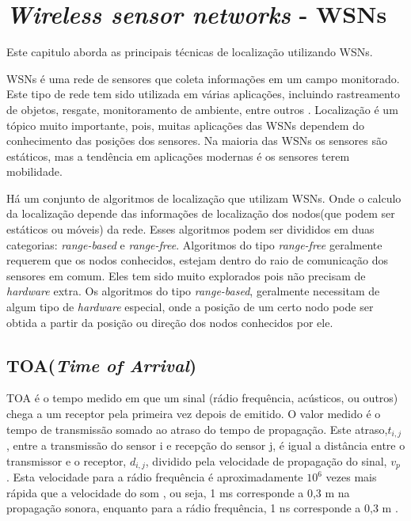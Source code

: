 \chapter{\textit{Wireless sensor networks} - WSNs}

Este capitulo aborda as principais técnicas de localização utilizando WSNs.

\label{wsn}
	WSNs é uma rede de sensores que coleta informações em um campo monitorado. Este tipo de rede tem sido utilizada em 
	várias aplicações, incluindo rastreamento de objetos, resgate, monitoramento de ambiente, entre outros \cite{omc}. Localização é um 
	tópico muito importante, pois, muitas aplicações das WSNs dependem do conhecimento das posições dos sensores. Na maioria das WSNs 
	os sensores são estáticos, mas a tendência em aplicações modernas é os sensores terem mobilidade.
	
	Há um conjunto de algoritmos de localização que utilizam WSNs. Onde o calculo da localização depende das informações 
	de localização dos nodos(que podem ser estáticos ou móveis) da rede. Esses algoritmos podem ser divididos em duas categorias: \textit{range-based}
	e \textit{range-free}. Algoritmos do tipo \textit{range-free} \cite{omc} \cite{wsnsLinear} geralmente requerem que os nodos conhecidos, estejam dentro 
	do raio de comunicação dos sensores em comum. Eles tem sido muito explorados pois não precisam de \textit{hardware} extra. Os algoritmos do tipo \textit{range-based},
	geralmente necessitam de algum tipo de \textit{hardware} especial, onde a posição de um certo nodo pode ser obtida a partir da posição ou direção dos nodos conhecidos por ele.
	
\section{TOA(\textit{Time of Arrival})}
	TOA é o tempo medido em que um sinal (rádio frequência, acústicos, ou outros) chega a um
receptor pela primeira vez depois de emitido\cite{gps}. O valor medido é o tempo de transmissão somado ao
atraso do tempo de propagação. Este atraso,$t_{i,j}$
, entre a transmissão do sensor i e recepção do sensor j, é igual a distância entre o transmissor e o receptor, 
$d_{i,j}$, dividido pela velocidade de propagação do sinal, $v_{p}$
. Esta velocidade para a rádio frequência é aproximadamente $10^{6}$  vezes mais rápida que a velocidade do som \cite{gps},
ou seja, 1 ms corresponde a 0,3 m na propagação sonora, enquanto para a rádio frequência, 1 ns corresponde a 0,3 m \cite{gps}.

